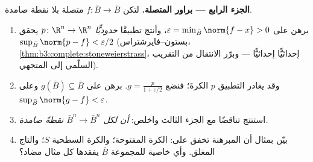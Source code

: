 \begin{problem}
\medskip
\noindent\textbf{الجزء الرابع --- براور المتصلة.} لتكن $f\colon\bar B\to\bar B$
متصلة بلا نقطة صامدة.
\begin{enumerate}[resume]
  \item برهن على $\varepsilon = \min_{\bar B}\norm{f - x} > 0$، وأنتج تطبيقًا \emph{حدوديًّا} $p\colon\R^n\to
        \R^n$
        يحقق $\sup_{\bar B}\norm{p - f} <
        \varepsilon/2$ (بستون--فايرشتراس، \cref{thm:b3:complete:stoneweierstrass}، إحداثيًّا
        إحداثيًّا --- وبرّر الانتقال من التقريب السلّمي إلى
        المتجهي).
  \item وقد يغادر التطبيق $p$ الكرةَ؛ فنضع $g = \frac{p}{1
        + \varepsilon/2}$. برهن على
        $g(\bar B) \subseteq \bar B$ وعلى $\sup_{\bar B}\norm{g - f} < \varepsilon$.
  \item استنتج تناقضًا مع الجزء الثالث واخلص: \emph{أن لكل  $\bar B^n \to \bar B^n$ نقطةً صامدة.}
  \item بيّن بمثال أن المبرهنة تخفق على: الكرة المفتوحة؛
        والكرة السطحية $S$؛ والتاج المغلق. وأي خاصية للمجموعة
        $\bar B$ يفقدها كل مثال مضاد؟
\end{enumerate}


\end{problem}
